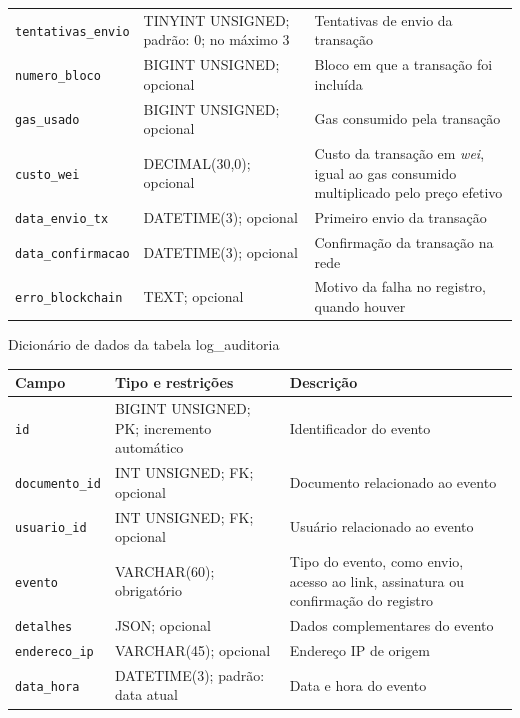 \documentclass[
    12pt,
    a4paper,
    oneside,
    chapter=TITLE,
    section=TITLE,
    subsection=TITLE,
    subsubsection=TITLE,
    sumario=tradicional,
    english,
    brazil
]{abntex2}
\newcommand{\elem}[1]{\texttt{#1}}
\begin{document}
\begin{quadro}[H]
\begin{tabular}{L{4.5cm}L{3.6cm}L{6.3cm}}
        \elem{tentativas\_envio} & TINYINT UNSIGNED; padrão: 0; no máximo 3 & Tentativas de envio da transação \\
        \elem{numero\_bloco} & BIGINT UNSIGNED; opcional & Bloco em que a transação foi incluída \\
        \elem{gas\_usado} & BIGINT UNSIGNED; opcional & Gas consumido pela transação \\
        \elem{custo\_wei} & DECIMAL(30,0); opcional & Custo da transação em \emph{wei}, igual ao gas consumido multiplicado pelo preço efetivo \\
        \elem{data\_envio\_tx} & DATETIME(3); opcional & Primeiro envio da transação \\
        \elem{data\_confirmacao} & DATETIME(3); opcional & Confirmação da transação na rede \\
        \elem{erro\_blockchain} & TEXT; opcional & Motivo da falha no registro, quando houver \\
        \bottomrule
    \end{tabular}
\end{quadro}

\begin{quadro}[H]
    \caption{Dicionário de dados da tabela log\_auditoria}
    \label{quadro:dic-log}
    \centering
    \footnotesize
    \begin{tabular}{L{4.5cm}L{3.6cm}L{6.3cm}}
        \toprule
        \textbf{Campo} & \textbf{Tipo e restrições} & \textbf{Descrição} \\
        \midrule
        \elem{id} & BIGINT UNSIGNED; PK; incremento automático & Identificador do evento \\
        \elem{documento\_id} & INT UNSIGNED; FK; opcional & Documento relacionado ao evento \\
        \elem{usuario\_id} & INT UNSIGNED; FK; opcional & Usuário relacionado ao evento \\
        \elem{evento} & VARCHAR(60); obrigatório & Tipo do evento, como envio, acesso ao link, assinatura ou confirmação do registro \\
        \elem{detalhes} & JSON; opcional & Dados complementares do evento \\
        \elem{endereco\_ip} & VARCHAR(45); opcional & Endereço IP de origem \\
        \elem{data\_hora} & DATETIME(3); padrão: data atual & Data e hora do evento \\
        \bottomrule
    \end{tabular}
\end{quadro}
\endgroup
\FloatBarrier
\end{document}

